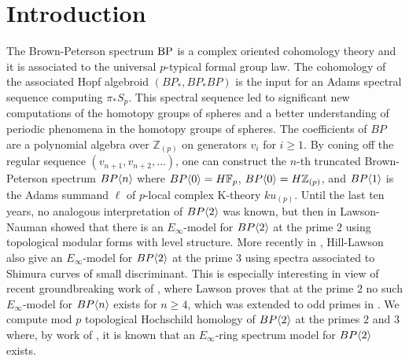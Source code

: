 
\section{Introduction}
The Brown-Peterson spectrum $\mathrm{BP}$ is a complex oriented cohomology theory and it is associated to the universal $p$-typical formal group law. The cohomology of the associated Hopf algebroid $(BP_*,BP_*BP)$ is the input for an Adams spectral sequence computing $\pi_*S_p$. This spectral sequence led to significant new computations of the homotopy groups of spheres and a better understanding of periodic phenomena in the homotopy groups of spheres. The coefficients of $BP$ are a polynomial algebra over $\mathbb{Z}_{(p)}$ on generators $v_i$ for $i\ge 1$. By coning off the regular sequence $(v_{n+1},v_{n+2},\ldots )$, one can construct the $n$-th truncated Brown-Peterson spectrum $BP\langle n \rangle$ where $BP\langle 0 \rangle=H\mathbb{F}_p$, $BP\langle 0 \rangle=H\mathbb{Z}_{(p)}$, and $BP\langle 1 \rangle$ is the Adams summand $\ell$ of $p$-local complex K-theory $ku_{(p)}$. Until the last ten years, no analogous interpretation of $BP\langle 2 \rangle$ was known, but then in \cite{LawsonNaumann} Lawson-Nauman showed that there is an $E_{\infty}$-model for $BP\langle 2 \rangle$ at the prime $2$ using topological modular forms with level structure. More recently in \cite{HillLawson}, Hill-Lawson also give an $E_{\infty}$-model for $BP\langle 2 \rangle$ at the prime $3$ using spectra associated to Shimura curves of small discriminant. This is especially interesting in view of recent groundbreaking work of \cite{Law18}, where Lawson proves that at the prime $2$ no such $E_{\infty}$-model for $BP\langle n \rangle$ exists for $n\ge 4$, which was extended to odd primes in \cite{Sen17}. 
We compute mod $p$ topological Hochschild homology of $BP\langle 2 \rangle$ at the primes $2$ and $3$ where, by work of \cites{HillLawson,LawsonNaumann}, it is known that an $E_{\infty}$-ring spectrum model for $BP\langle 2 \rangle$ exists. 

